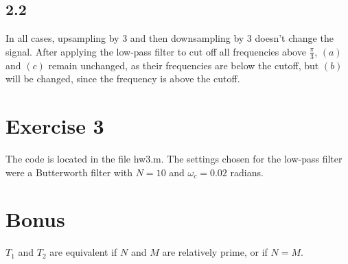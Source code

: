 \documentclass[12pt]{article}
\begin{document}
\subsection*{2.2}
In all cases, upsampling by 3 and then downsampling by 3 doesn't change the signal. After applying the low-pass filter to cut off all frequencies above $\frac{\pi}{3}$, $(a)$ and $(c)$ remain unchanged, as their frequencies are below the cutoff, but $(b)$ will be changed, since the frequency is above the cutoff.

\section*{Exercise 3}
The code is located in the file hw3.m. The settings chosen for the low-pass filter were a Butterworth filter with $N = 10$ and $\omega_c = 0.02$ radians.

\section*{Bonus}
$T_1$ and $T_2$ are equivalent if $N$ and $M$ are relatively prime, or if $N = M$.
\end{document}
